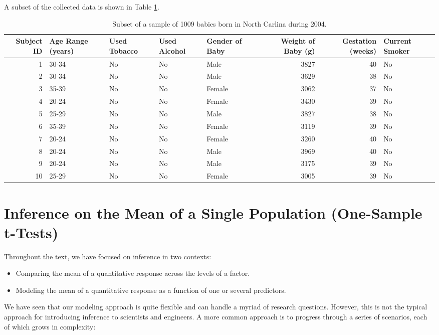 \documentclass[]{book}
\providecommand{\tightlist}{%
  \setlength{\itemsep}{0pt}\setlength{\parskip}{0pt}}
\theoremstyle{definition}
\theoremstyle{definition}
\theoremstyle{definition}
\theoremstyle{remark}
\begin{document}
A subset of the collected data is shown in Table
\ref{tab:casebabies-table}.

\begin{table}

\caption{\label{tab:casebabies-table}Subset of a sample of 1009 babies born in North Carlina during 2004.}
\centering
\begin{tabular}[t]{r|l|l|l|l|r|r|l}
\hline
Subject ID & Age Range (years) & Used Tobacco & Used Alcohol & Gender of Baby & Weight of Baby (g) & Gestation (weeks) & Current Smoker\\
\hline
1 & 30-34 & No & No & Male & 3827 & 40 & No\\
\hline
2 & 30-34 & No & No & Male & 3629 & 38 & No\\
\hline
3 & 35-39 & No & No & Female & 3062 & 37 & No\\
\hline
4 & 20-24 & No & No & Female & 3430 & 39 & No\\
\hline
5 & 25-29 & No & No & Male & 3827 & 38 & No\\
\hline
6 & 35-39 & No & No & Female & 3119 & 39 & No\\
\hline
7 & 20-24 & No & No & Female & 3260 & 40 & No\\
\hline
8 & 20-24 & No & No & Male & 3969 & 40 & No\\
\hline
9 & 20-24 & No & No & Male & 3175 & 39 & No\\
\hline
10 & 25-29 & No & No & Female & 3005 & 39 & No\\
\hline
\end{tabular}
\end{table}

\chapter{Inference on the Mean of a Single Population (One-Sample
t-Tests)}\label{OneMean}

Throughout the text, we have focused on inference in two contexts:

\begin{itemize}
\tightlist
\item
  Comparing the mean of a quantitative response across the levels of a
  factor.
\item
  Modeling the mean of a quantitative response as a function of one or
  several predictors.
\end{itemize}

We have seen that our modeling approach is quite flexible and can handle
a myriad of research questions. However, this is not the typical
approach for introducing inference to scientists and engineers. A more
common approach is to progress through a series of scenarios, each of
which grows in complexity:
\end{document}
